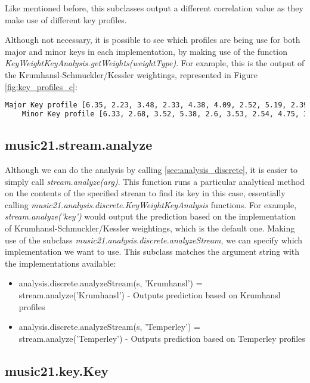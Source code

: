 Like mentioned before, this subclasses output a different correlation value as they make use of different key profiles.

Although not necessary, it is possible to see which profiles are being use for both major and minor keys in each implementation, by making use of the function \textit{KeyWeightKeyAnalysis.getWeights(weightType)}.
For example, this is the output of the Krumhansl-Schmuckler/Kessler weightings, represented in Figure \ref{fig:key_profiles_c}:

\begin{lstlisting}[language=bash]
    Major Key profile [6.35, 2.23, 3.48, 2.33, 4.38, 4.09, 2.52, 5.19, 2.39, 3.66, 2.29, 2.88]
    Minor Key profile [6.33, 2.68, 3.52, 5.38, 2.6, 3.53, 2.54, 4.75, 3.98, 2.69, 3.34, 3.17]
\end{lstlisting}

\subsection{music21.stream.analyze}

Although we can do the analysis by calling \ref{sec:analysis_discrete}, it is easier to simply call \textit{stream.analyze(arg)}.
This function runs a particular analytical method on the contents of the specified stream to find its key in this case, essentially calling \textit{music21.analysis.discrete.KeyWeightKeyAnalysis} functions.
For example, \textit{stream.analyze('key')} would output the prediction based on the implementation of Krumhansl-Schmuckler/Kessler weightings, which is the default one.
Making use of the subclass \textit{music21.analysis.discrete.analyzeStream}, we can specify which implementation we want to use.
This subclass matches the argument string with the implementations available:
\begin{itemize}
    \item analysis.discrete.analyzeStream(s, 'Krumhansl') = stream.analyze('Krumhansl') - Outputs prediction based on Krumhansl profiles
    \item analysis.discrete.analyzeStream(s, 'Temperley') = stream.analyze('Temperley') - Outputs prediction based on Temperley profiles
\end{itemize}

\subsection{music21.key.Key} \label{sec:key}

